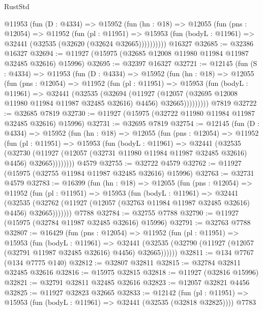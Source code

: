 \begin{lexlean}{RustStd}
\begin{coremodule}
      @11953
        (fun (D : @4334) =>
        @15952
          (fun (hn : @18) =>
          @12055
            (fun (pns : @12054) =>
            @11952
              (fun (pl : @11951) =>
              @15953 (fun (bodyL : @11961) => @32441 (@32535 (@32620 (@32624 @32665))))))))))
    @16327
@32685 := @32386 @16327
@32694 := @11927 (@15975 (@32685 @12008 @11980 @11984 @11987 @32485 @32616) @15996)
@32695 := @32397 @16327
@32721 := @12145
    (fun (S : @4334) =>
    @11953
      (fun (D : @4334) =>
      @15952
        (fun (hn : @18) =>
        @12055
          (fun (pns : @12054) =>
          @11952
            (fun (pl : @11951) =>
            @15953
              (fun (bodyL : @11961) =>
              @32441
                (@32535
                  (@32694
                    (@11927
                      (@12057 (@32695 @12008 @11980 @11984 @11987 @32485 @32616) @4456)
                      @32665)))))))))
    @7819
@32722 := @32685 @7819
@32730 := @11927 (@15975 (@32722 @11980 @11984 @11987 @32485 @32616) @15996)
@32731 := @32695 @7819
@32754 := @12145
    (fun (D : @4334) =>
    @15952
      (fun (hn : @18) =>
      @12055
        (fun (pns : @12054) =>
        @11952
          (fun (pl : @11951) =>
          @15953
            (fun (bodyL : @11961) =>
            @32441
              (@32535
                (@32730
                  (@11927 (@12057 (@32731 @11980 @11984 @11987 @32485 @32616) @4456) @32665))))))))
    @4579
@32755 := @32722 @4579
@32762 := @11927 (@15975 (@32755 @11984 @11987 @32485 @32616) @15996)
@32763 := @32731 @4579
@32783 := @16399
    (fun (hn : @18) =>
    @12055
      (fun (pns : @12054) =>
      @11952
        (fun (pl : @11951) =>
        @15953
          (fun (bodyL : @11961) =>
          @32441
            (@32535
              (@32762 (@11927 (@12057 (@32763 @11984 @11987 @32485 @32616) @4456) @32665)))))))
    @7788
@32784 := @32755 @7788
@32790 := @11927 (@15975 (@32784 @11987 @32485 @32616) @15996)
@32791 := @32763 @7788
@32807 := @16429
    (fun (pns : @12054) =>
    @11952
      (fun (pl : @11951) =>
      @15953
        (fun (bodyL : @11961) =>
        @32441 (@32535 (@32790 (@11927 (@12057 (@32791 @11987 @32485 @32616) @4456) @32665))))))
@32811 := @134 @7767 (@134 @7775 @140)
@32812 := @32807 @32811
@32815 := @32784 @32811 @32485 @32616
@32816 := @15975 @32815
@32818 := @11927 (@32816 @15996)
@32821 := @32791 @32811 @32485 @32616
@32823 := @12057 @32821 @4456
@32825 := @11927 @32823 @32665
@32833 := @12142
    (fun (pl : @11951) => @15953 (fun (bodyL : @11961) => @32441 (@32535 (@32818 @32825))))
    @7783

\end{coremodule}
\end{lexlean}
